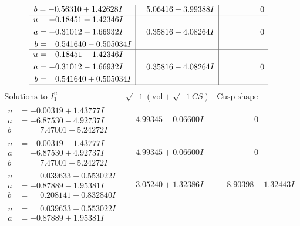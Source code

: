 \documentclass[1p]{elsarticle_modified}
\theoremstyle{definition}
\newcommand{\I}{\sqrt{-1}}
\begin{document}
$$\begin{array}{c|c|c}
\begin{aligned}
b &= -0.56310 + 1.42628 I\end{aligned}
 & \phantom{-}5.06416 + 3.99388 I & \phantom{-0.000000 } 0 \\ \hline\begin{aligned}
u &= -0.18451 + 1.42346 I \\
a &= -0.31012 + 1.66932 I \\
b &= \phantom{-}0.541640 - 0.505034 I\end{aligned}
 & \phantom{-}0.35816 + 4.08264 I & \phantom{-0.000000 } 0 \\ \hline\begin{aligned}
u &= -0.18451 - 1.42346 I \\
a &= -0.31012 - 1.66932 I \\
b &= \phantom{-}0.541640 + 0.505034 I\end{aligned}
 & \phantom{-}0.35816 - 4.08264 I & \phantom{-0.000000 } 0\\
 \hline 
 \end{array}$$\newpage$$\begin{array}{c|c|c}  
\text{Solutions to }I^u_{1}& \I (\text{vol} + \sqrt{-1}CS) & \text{Cusp shape}\\
 \hline 
\begin{aligned}
u &= -0.00319 + 1.43777 I \\
a &= -6.87530 - 4.92737 I \\
b &= \phantom{-}7.47001 + 5.24272 I\end{aligned}
 & \phantom{-}4.99345 - 0.06600 I & \phantom{-0.000000 } 0 \\ \hline\begin{aligned}
u &= -0.00319 - 1.43777 I \\
a &= -6.87530 + 4.92737 I \\
b &= \phantom{-}7.47001 - 5.24272 I\end{aligned}
 & \phantom{-}4.99345 + 0.06600 I & \phantom{-0.000000 } 0 \\ \hline\begin{aligned}
u &= \phantom{-}0.039633 + 0.553022 I \\
a &= -0.87889 - 1.95381 I \\
b &= \phantom{-}0.208141 + 0.832840 I\end{aligned}
 & \phantom{-}3.05240 + 1.32386 I & \phantom{-}8.90398 - 1.32443 I \\ \hline\begin{aligned}
u &= \phantom{-}0.039633 - 0.553022 I \\
a &= -0.87889 + 1.95381 I \\

\end{aligned}
\end{array}$$
\end{document}
